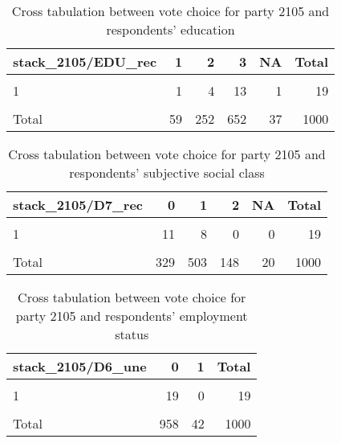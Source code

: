 \documentclass[
]{article}
\begin{document}
\begin{table}

\caption{\label{tab:unnamed-chunk-140}Cross tabulation between vote choice for party 2105 and respondents' education 
                   \label{table:crosstab_1_pl}}
\centering
\begin{tabular}[t]{l|r|r|r|r|r}
\hline
stack\_2105/EDU\_rec & 1 & 2 & 3 & NA & Total\\
\hline
\cellcolor{gray!6}{0} & \cellcolor{gray!6}{57} & \cellcolor{gray!6}{246} & \cellcolor{gray!6}{636} & \cellcolor{gray!6}{34} & \cellcolor{gray!6}{973}\\
\hline
1 & 1 & 4 & 13 & 1 & 19\\
\hline
\cellcolor{gray!6}{NA} & \cellcolor{gray!6}{1} & \cellcolor{gray!6}{2} & \cellcolor{gray!6}{3} & \cellcolor{gray!6}{2} & \cellcolor{gray!6}{8}\\
\hline
Total & 59 & 252 & 652 & 37 & 1000\\
\hline
\end{tabular}
\end{table}

\begin{table}

\caption{\label{tab:unnamed-chunk-140}Cross tabulation between vote choice for party 2105 and respondents' subjective social class
                   \label{table:crosstab_2_pl}}
\centering
\begin{tabular}[t]{l|r|r|r|r|r}
\hline
stack\_2105/D7\_rec & 0 & 1 & 2 & NA & Total\\
\hline
\cellcolor{gray!6}{0} & \cellcolor{gray!6}{314} & \cellcolor{gray!6}{493} & \cellcolor{gray!6}{147} & \cellcolor{gray!6}{19} & \cellcolor{gray!6}{973}\\
\hline
1 & 11 & 8 & 0 & 0 & 19\\
\hline
\cellcolor{gray!6}{NA} & \cellcolor{gray!6}{4} & \cellcolor{gray!6}{2} & \cellcolor{gray!6}{1} & \cellcolor{gray!6}{1} & \cellcolor{gray!6}{8}\\
\hline
Total & 329 & 503 & 148 & 20 & 1000\\
\hline
\end{tabular}
\end{table}

\begin{table}

\caption{\label{tab:unnamed-chunk-140}Cross tabulation between vote choice for party 2105 and respondents' employment status 
                   \label{table:crosstab_3_pl}}
\centering
\begin{tabular}[t]{l|r|r|r}
\hline
stack\_2105/D6\_une & 0 & 1 & Total\\
\hline
\cellcolor{gray!6}{0} & \cellcolor{gray!6}{931} & \cellcolor{gray!6}{42} & \cellcolor{gray!6}{973}\\
\hline
1 & 19 & 0 & 19\\
\hline
\cellcolor{gray!6}{NA} & \cellcolor{gray!6}{8} & \cellcolor{gray!6}{0} & \cellcolor{gray!6}{8}\\
\hline
Total & 958 & 42 & 1000\\
\hline
\end{tabular}
\end{table}
\end{document}

